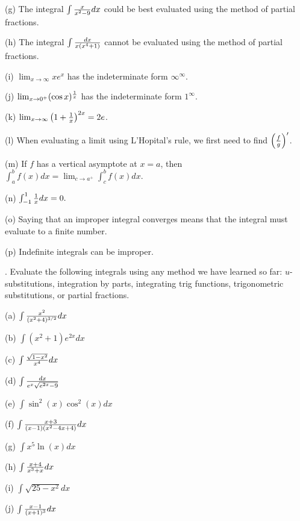 \documentclass[12pt]{article}
\begin{document}
\smallskip
\noindent (g) The integral $\int {{x}\over{x^2-9}} dx$ could be best 
evaluated using the method of partial fractions.

\smallskip
\noindent (h) The integral $\int {{dx}\over{x (x^4+1)}}$ cannot be 
evaluated using the method of partial fractions. 

\smallskip
\noindent (i) $\lim_{x \to \infty} xe^x$ has the indeterminate form 
$\infty^{\infty}$.

\smallskip
\noindent (j) $\lim_{x \to 0^+} (\cos x)^{{1}\over{x}}$ has the indeterminate 
form $1^{\infty}$.

\smallskip
\noindent (k) $\lim_{x \to \infty} \left ( 1 + {{1}\over{x}} \right )^{2x} = 
2e$.

\smallskip
\noindent (l) When evaluating a limit using L'Hopital's rule, we first need to 
find $\left ( {{f}\over{g}} \right )^{\prime}$. 

\smallskip
\noindent (m) If $f$ has a vertical asymptote at $x=a$, then $\int_a^b f(x) dx 
= \lim_{c \to a^+} \int_c^b f(x) dx$.

\smallskip
\noindent (n) $\int_{-1}^1 {{1}\over{x}} dx = 0.$

\smallskip
\noindent (o) Saying that an improper integral converges means that the 
integral must evaluate to a finite number.

\smallskip
\noindent (p) Indefinite integrals can be improper.

\bigskip
{}. Evaluate the following integrals using any method we have 
learned so far: \hfil\break
$u$-substitutions, integration by parts, integrating trig functions,
trigonometric substitutions, or partial fractions.

\noindent (a) $\int {{x^2}\over{(x^2+4)^{3/2}}} dx$

\noindent (b)  $\int (x^2+1) e^{2x} dx$

\noindent (c) $\int {{\sqrt{1-x^2}}\over{x^4}} dx$

\noindent (d)  $\int {{dx}\over{e^x \sqrt{e^{2x} - 9}}}$

\noindent (e)  $\int \sin^2(x) \cos^2(x) dx$

\noindent (f) $\int {{x+3}\over{(x-1)(x^2-4x+4)}} dx$

\noindent (g) $\int x^5 \ln (x) dx$

\noindent (h) $\int {{x+4}\over{x^3+x}} dx$

\noindent (i) $\int \sqrt{25-x^2} dx$

\noindent (j) $\int {{x-1}\over{(x+1)^3}} dx$
\end{document}
